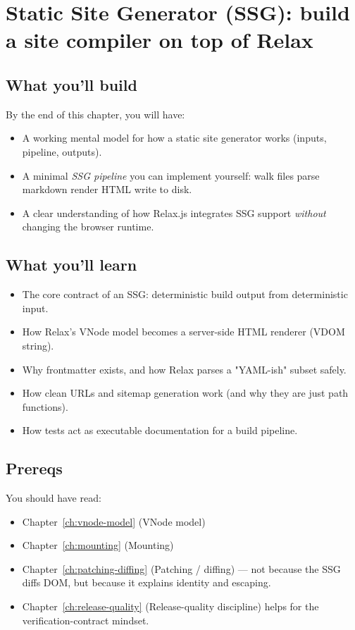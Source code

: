 \chapter{Static Site Generator (SSG): build a site compiler on top of Relax}
\label{ch:ssg}

\section{What you'll build}
By the end of this chapter, you will have:

\begin{itemize}
  \item A working mental model for how a static site generator works (inputs, pipeline, outputs).
  \item A minimal \emph{SSG pipeline} you can implement yourself: walk files \textrightarrow parse markdown \textrightarrow render HTML \textrightarrow write to disk.
  \item A clear understanding of how Relax.js integrates SSG support \emph{without} changing the browser runtime.
\end{itemize}

\section{What you'll learn}
\begin{itemize}
  \item The core contract of an SSG: deterministic build output from deterministic input.
  \item How Relax's VNode model becomes a server-side HTML renderer (VDOM \textrightarrow string).
  \item Why frontmatter exists, and how Relax parses a "YAML-ish" subset safely.
  \item How clean URLs and sitemap generation work (and why they are just path functions).
  \item How tests act as executable documentation for a build pipeline.
\end{itemize}

\section{Prereqs}
You should have read:

\begin{itemize}
  \item Chapter~\ref{ch:vnode-model} (VNode model)
  \item Chapter~\ref{ch:mounting} (Mounting)
  \item Chapter~\ref{ch:patching-diffing} (Patching / diffing) --- not because the SSG diffs DOM, but because it explains identity and escaping.
  \item Chapter~\ref{ch:release-quality} (Release-quality discipline) helps for the verification-contract mindset.
\end{itemize}

